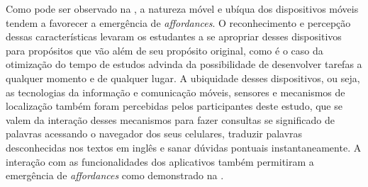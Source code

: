 \documentclass[portuguese]{textolivre}
\begin{document}
Como pode ser observado na , a natureza móvel e ubíqua dos dispositivos móveis tendem a favorecer a emergência de \emph{affordances}. O reconhecimento e percepção dessas características levaram os estudantes a se apropriar desses dispositivos para propósitos que vão além de seu propósito original, como é o caso da otimização do tempo de estudos advinda da possibilidade de desenvolver tarefas a qualquer momento e de qualquer lugar. A ubiquidade desses dispositivos, ou seja, as tecnologias da informação e comunicação móveis, sensores e mecanismos de localização também foram percebidas pelos participantes deste estudo, que se valem da interação desses mecanismos para fazer consultas se significado de palavras acessando o navegador dos seus celulares, traduzir  palavras desconhecidas nos textos em inglês e sanar dúvidas pontuais instantaneamente. A interação com as funcionalidades dos aplicativos também permitiram a emergência de \emph{affordances} como demonstrado na .
\end{document}
